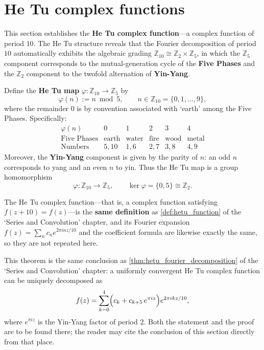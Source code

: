 \section{He Tu complex functions}

This section establishes the \textbf{He Tu complex function}---a complex function of period $10$. The He Tu structure reveals that the Fourier decomposition of period $10$ automatically exhibits the algebraic grading $\mathbb{Z}_{10} \cong \mathbb{Z}_2 \times \mathbb{Z}_5$, in which the $\mathbb{Z}_5$ component corresponds to the mutual-generation cycle of the \textbf{Five Phases} and the $\mathbb{Z}_2$ component to the twofold alternation of \textbf{Yin-Yang}.

\begin{definition}\label{def:hetu_mapping_yijing}
Define the \textbf{He Tu map} $\varphi: \mathbb{Z}_{10} \to \mathbb{Z}_5$ by
\[
\varphi(n) := n \bmod 5, \qquad n \in \mathbb{Z}_{10} = \{0, 1, \dots, 9\},
\]
where the remainder $0$ is by convention associated with `earth' among the Five Phases. Specifically:
\[
\begin{array}{c|ccccc}
\varphi(n) & 0 & 1 & 2 & 3 & 4 \\
\hline
\text{Five Phases} & \text{earth} & \text{water} & \text{fire} & \text{wood} & \text{metal} \\
\text{Numbers} & 5, 10 & 1, 6 & 2, 7 & 3, 8 & 4, 9
\end{array}
\]
Moreover, the \textbf{Yin-Yang} component is given by the parity of $n$: an odd $n$ corresponds to yang and an even $n$ to yin. Thus the He Tu map is a group homomorphism
\[
\varphi: \mathbb{Z}_{10} \to \mathbb{Z}_5, \qquad \ker \varphi = \{0, 5\} \cong \mathbb{Z}_2.
\]
\end{definition}

\begin{remark}\label{def:hetu_function_yijing}
The He Tu complex function---that is, a complex function satisfying $f(z + 10) = f(z)$---is the \textbf{same definition} as \cref{def:hetu_function} of the `Series and Convolution' chapter, and its Fourier expansion $f(z) = \sum_{n} c_n e^{2\pi i n z/10}$ and the coefficient formula are likewise exactly the same, so they are not repeated here.
\end{remark}

\begin{remark}\label{thm:hetu_fourier_decomposition_yijing}
This theorem is the same conclusion as \cref{thm:hetu_fourier_decomposition} of the `Series and Convolution' chapter: a uniformly convergent He Tu complex function can be uniquely decomposed as
\[
f(z) = \sum_{k=0}^{4} \Bigl( c_k + c_{k+5}\, e^{\pi i z} \Bigr) e^{2\pi i k z / 10},
\]
where $e^{\pi i z}$ is the Yin-Yang factor of period $2$. Both the statement and the proof are to be found there; the reader may cite the conclusion of this section directly from that place.
\end{remark}

